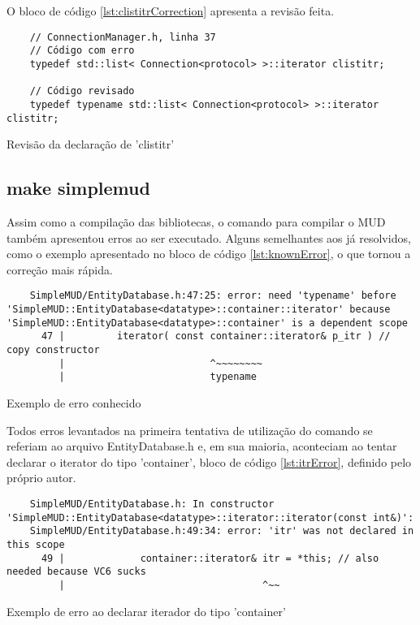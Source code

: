 O bloco de código \ref{lst:clistitrCorrection} apresenta a revisão feita.

\begin{listing}[!ht]
    \begin{verbatim}
    // ConnectionManager.h, linha 37
    // Código com erro
    typedef std::list< Connection<protocol> >::iterator clistitr;

    // Código revisado
    typedef typename std::list< Connection<protocol> >::iterator clistitr;
    \end{verbatim}
\caption{Revisão da declaração de 'clistitr'}
\label{lst:clistitrCorrection}
\end{listing}

\subsection{make simplemud}

Assim como a compilação das bibliotecas, o comando para compilar o MUD também apresentou 
erros ao ser executado. Alguns semelhantes aos já resolvidos, como o exemplo apresentado 
no bloco de código \ref{lst:knownError}, o que tornou a correção mais rápida.

\begin{listing}[!ht]
    \begin{verbatim}
    SimpleMUD/EntityDatabase.h:47:25: error: need 'typename' before 'SimpleMUD::EntityDatabase<datatype>::container::iterator' because 'SimpleMUD::EntityDatabase<datatype>::container' is a dependent scope
      47 |         iterator( const container::iterator& p_itr ) // copy constructor
         |                         ^~~~~~~~~
         |                         typename 
    \end{verbatim}
\caption{Exemplo de erro conhecido}
\label{lst:knownError}
\end{listing}

Todos erros levantados na primeira tentativa de utilização do comando se referiam ao arquivo
EntityDatabase.h e, em sua maioria, aconteciam ao tentar declarar o iterator do tipo 'container',
bloco de código \ref{lst:itrError}, definido pelo próprio autor.

\begin{listing}[!ht]
    \begin{verbatim}
    SimpleMUD/EntityDatabase.h: In constructor 'SimpleMUD::EntityDatabase<datatype>::iterator::iterator(const int&)':
    SimpleMUD/EntityDatabase.h:49:34: error: 'itr' was not declared in this scope
      49 |             container::iterator& itr = *this; // also needed because VC6 sucks
         |                                  ^~~
    \end{verbatim}
\caption{Exemplo de erro ao declarar iterador do tipo 'container'}
\label{lst:itrError}
\end{listing}

